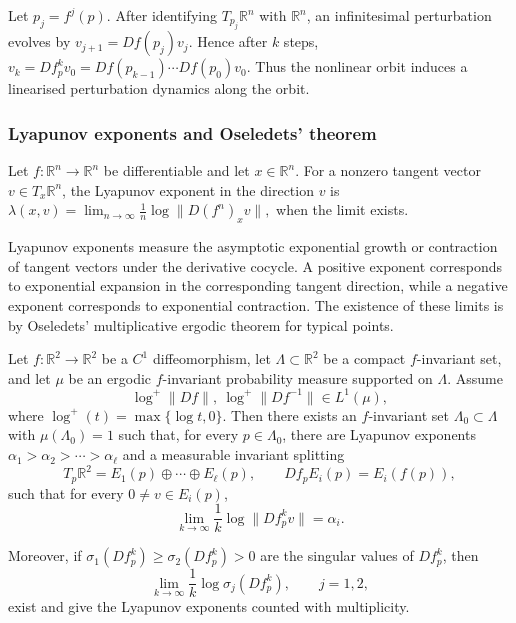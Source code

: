 Let \(p_j=f^j(p)\). After identifying \(T_{p_j}\mathbb R^n\) with \(\mathbb R^n\), an infinitesimal perturbation evolves by \(
v_{j+1}=Df(p_j)v_j.\) Hence after \(k\) steps,
\(
v_k=Df_p^k v_0
=
Df(p_{k-1})\cdots Df(p_0)v_0.
\)
Thus the nonlinear orbit induces a linearised perturbation dynamics along the orbit.




\subsubsection{Lyapunov exponents and Oseledets' theorem}

\begin{definition}
Let \(f:\mathbb R^n\to\mathbb R^n\) be differentiable and let \(x\in \mathbb R^n\). For a nonzero tangent vector \(v\in T_x\mathbb R^n \), the Lyapunov exponent in the direction \(v\) is
\(\lambda(x,v) =
\lim_{n\to\infty}
\frac{1}{n}\log \|D(f^n)_x v\|,
\)
when the limit exists.
\end{definition}

Lyapunov exponents measure the asymptotic exponential growth or contraction of tangent vectors under the derivative cocycle. A positive exponent corresponds to exponential expansion in the corresponding tangent direction, while a negative exponent corresponds to exponential contraction. The existence of these limits is by Oseledets'
multiplicative ergodic theorem for typical points.





\begin{theorem}
Let \(f:\mathbb R^2\to\mathbb R^2\) be a \(C^1\) diffeomorphism, let
\(\Lambda\subset\mathbb R^2\) be a compact \(f\)-invariant set, and let \(\mu\)
be an ergodic \(f\)-invariant probability measure supported on \(\Lambda\).
Assume
\[
\log^+\|Df\|,\ \log^+\|Df^{-1}\|\in L^1(\mu),
\]
where \(\log^+(t)=\max\{\log t,0\}\). Then there exists an \(f\)-invariant set
\(\Lambda_0\subset\Lambda\) with \(\mu(\Lambda_0)=1\) such that, for every
\(p\in\Lambda_0\), there are Lyapunov exponents \(\alpha_1>\alpha_2>\cdots>\alpha_\ell
\)
and a measurable invariant splitting
\[
T_p\mathbb R^2
=
E_1(p)\oplus\cdots\oplus E_\ell(p),
\qquad
Df_pE_i(p)=E_i(f(p)),
\]
such that for every \(0\neq v\in E_i(p)\),
\[
\lim_{k\to\infty}\frac1k\log\|Df_p^k v\|
=
\alpha_i.
\]

Moreover, if \(\sigma_1(Df_p^k)\geq\sigma_2(Df_p^k)>0\) are the singular
values of \(Df_p^k\), then
\[
\lim_{k\to\infty}\frac1k\log\sigma_j(Df_p^k),
\qquad j=1,2,
\]
exist and give the Lyapunov exponents counted with multiplicity.
\end{theorem}

